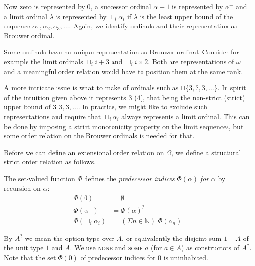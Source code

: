 Now zero is represented by $0$, a successor ordinal $\alpha +1$ is represented
by $\alpha^+$ and a limit ordinal $\lambda$ is represented by $\sqcup_i
\alpha_i$ if $\lambda$ is the least upper bound of the sequence $\alpha_1,
\alpha_2, \alpha_3, \ldots$. %
Again, we identify ordinals and their representation as Brouwer ordinal.

Some ordinals have no unique representation as Brouwer ordinal. Consider for
example the limit ordinals $\sqcup_i i + 3$ and $\sqcup_i i \times 2$. Both
are representations of $\omega$ and a meaningful order relation would have to
position them at the same rank.

A more intricate issue is what to make of ordinals such as $\sqcup \{ 3, 3, 3,
\ldots \}$. In spirit of the intuition given above it represents $3$ ($4$),
that being the non-strict (strict) upper bound of $3, 3, 3, \ldots$.
In practice, we might like to exclude such representations and require that
$\sqcup_i \alpha_i$ always represents a limit ordinal. This can be done by
imposing a strict monotonicity property on the limit sequences, but some order
relation on the Brouwer ordinals is needed for that.


Before we can define an extensional order relation on $\Omega$, we define a
structural strict order relation as follows.

\begin{definition}%
The set-valued function $\Phi$ defines the \emph{predecessor indices} $\Phi(\alpha)$
\emph{for} $\alpha$ by recursion on $\alpha$:
\begin{align*}
  \Phi(0)                 &= \emptyset \\
  \Phi(\alpha^+)          &= \Phi(\alpha)^? \\
  \Phi(\sqcup_i \alpha_i) &= (\Sigma n \in \mathbb{N}) \; \Phi(\alpha_n)
\end{align*}
\end{definition}

By $A^?$ we mean the option type over $A$, or equivalently the disjoint sum
$1 + A$ of the unit type $1$ and $A$. We use \textsc{none} and \textsc{some
  $a$} (for $a \in A$) as constructors of $A^?$. Note that the set
$\Phi(0)$ of predecessor indices for $0$ is uninhabited.

